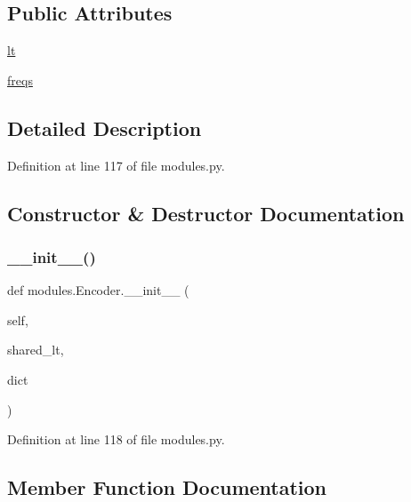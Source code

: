 \subsection*{Public Attributes}
\begin{DoxyCompactItemize}
\item 
\hyperlink{classmodules_1_1Encoder_a2ad9010a1e3b0929c72af620d17d5fd2}{lt}
\item 
\hyperlink{classmodules_1_1Encoder_aa03887967c20ff1b62aa6927c54fd1ba}{freqs}
\end{DoxyCompactItemize}


\subsection{Detailed Description}


Definition at line 117 of file modules.\+py.



\subsection{Constructor \& Destructor Documentation}
\mbox{\label{classmodules_1_1Encoder_aedd78d6423ac096e5c1c9857c68c6c42}} 
\subsubsection{\texorpdfstring{\+\_\+\+\_\+init\+\_\+\+\_\+()}{\_\_init\_\_()}}
{\footnotesize\ttfamily def modules.\+Encoder.\+\_\+\+\_\+init\+\_\+\+\_\+ (\begin{DoxyParamCaption}\item[{}]{self,  }\item[{}]{shared\+\_\+lt,  }\item[{}]{dict }\end{DoxyParamCaption})}



Definition at line 118 of file modules.\+py.



\subsection{Member Function Documentation}
\mbox{\label{classmodules_1_1Encoder_aeddb8f48da70ad07b3b86e3183eb87fa}} 

